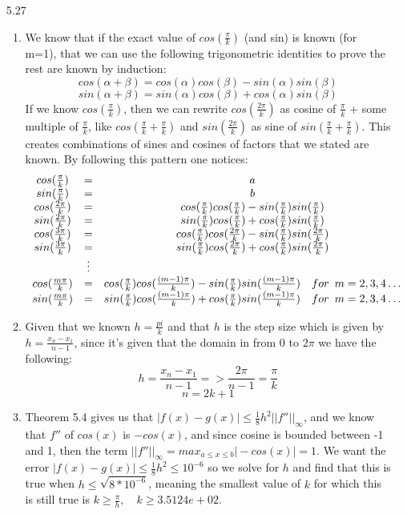 \documentclass[11pt,a4paper]{article}
\begin{document}
\begin{itemize}
			\item[5.27]
				\begin{enumerate} [label={\alph*)}]
					\item We know that if the exact value of $cos(\frac{\pi}{k})$ (and sin) is known (for m=1), that we can use the following trigonometric identities to prove the rest are known by induction:
					$$cos(\alpha + \beta) = cos(\alpha)cos(\beta)-sin(\alpha)sin(\beta)$$
					$$sin(\alpha + \beta) = sin(\alpha)cos(\beta)+cos(\alpha)sin(\beta)$$
					If we know $cos(\frac{\pi}{k})$, then we can rewrite $cos(\frac{2\pi}{k})$ as cosine of $\frac{\pi}{k}$ + some multiple of $\frac{\pi}{k}$, like $cos(\frac{\pi}{k}+\frac{\pi}{k})$ and $sin(\frac{2\pi}{k})$ as sine of $sin(\frac{\pi}{k}+\frac{\pi}{k})$. This creates combinations of sines and cosines of factors that we stated are known. By following this pattern one notices:
					$$
					\begin{array}{ccc}
						cos(\frac{\pi}{k}) & = & a \\
						sin(\frac{\pi}{k}) & = & b \\
						cos(\frac{2\pi}{k}) & = & cos(\frac{\pi}{k})cos(\frac{\pi}{k})-sin(\frac{\pi}{k})sin(\frac{\pi}{k}) \\
						sin(\frac{2\pi}{k}) & = & sin(\frac{\pi}{k})cos(\frac{\pi}{k})+cos(\frac{\pi}{k})sin(\frac{\pi}{k}) \\
						cos(\frac{3\pi}{k}) & = & cos(\frac{\pi}{k})cos(\frac{2\pi}{k})-sin(\frac{\pi}{k})sin(\frac{2\pi}{k}) \\
						sin(\frac{3\pi}{k}) & = & sin(\frac{\pi}{k})cos(\frac{2\pi}{k})+cos(\frac{\pi}{k})sin(\frac{2\pi}{k}) \\
						 & \vdots & \\
						 cos(\frac{m\pi}{k}) & = & cos(\frac{\pi}{k})cos(\frac{(m-1)\pi}{k})-sin(\frac{\pi}{k})sin(\frac{(m-1)\pi}{k}) \quad for \mkern9mu m = 2,3,4\dots  \\
						sin(\frac{m\pi}{k}) & = & sin(\frac{\pi}{k})cos(\frac{(m-1)\pi}{k})+cos(\frac{\pi}{k})sin(\frac{(m-1)\pi}{k}) \quad for  \mkern9mu m = 2,3,4\dots
					\end{array}
					$$
					\item Given that we known $h=\frac{pi}{k}$ and that $h$ is the step size which is given by $h=\frac{x_n-x_1}{n-1}$, since it's given that the domain in from 0 to $2\pi$ we have the following:
					$$h=\frac{x_n-x_1}{n-1}=>\frac{2\pi}{n-1}=\frac{\pi}{k}$$
					$$n=2k+1$$
					\item Theorem 5.4 gives us that $\vert f(x)-g(x)\vert\leq \frac{1}{8}h^2\vert\vert f''\vert\vert_\infty$, and we know that $f''$ of $cos(x)$ is $-cos(x)$, and since cosine is bounded between -1 and 1, then the term $\vert\vert f'' \vert\vert_\infty = max_{a \leq x \leq b}\vert -cos(x) \vert = 1$. We want the error $\vert f(x)-g(x)\vert \leq \frac{1}{8}h^2 \leq 10^{-6}$ so we solve for $h$ and find that this is true when $h\leq \sqrt{8*10^{-6}}$, meaning the smallest value of $k$ for which this is still true is $k\geq \frac{\pi}{h}, \quad k\geq 3.5124e+02$.

\end{enumerate}
\end{itemize}
\end{document}
